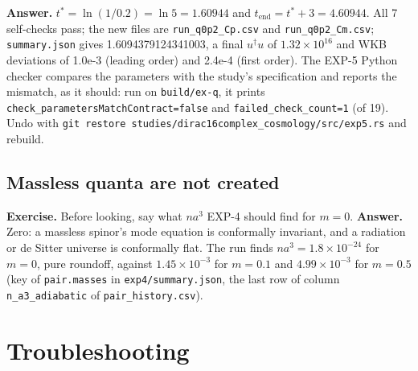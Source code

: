 \documentclass[11pt]{article}
\begin{document}
\textbf{Answer.} $t^*=\ln(1/0.2)=\ln5=1.60944$ and $t_{\mathrm{end}}=t^*+3=4.60944$. All 7 self-checks pass; the new files are \texttt{run\_q0p2\allowbreak{}\_Cp.csv} and \texttt{run\_q0p2\allowbreak{}\_Cm.csv}; \texttt{summary.\allowbreak{}json} gives \texttt{} 1.6094379124341003, a final $u^\dagger u$ of $1.32\times10^{16}$ and WKB deviations of 1.0e-3 (leading order) and 2.4e-4 (first order). The EXP-5 Python checker compares the parameters with the study's specification and reports the mismatch, as it should: run on \texttt{build/ex\allowbreak{}-q}, it prints \texttt{check\_pa\allowbreak{}rameters\allowbreak{}MatchCon\allowbreak{}tract=fa\allowbreak{}lse} and \texttt{failed\_c\allowbreak{}heck\_cou\allowbreak{}nt=1} (of 19). Undo with \texttt{git rest\allowbreak{}ore stud\allowbreak{}ies/dira\allowbreak{}c16compl\allowbreak{}ex\_cosmo\allowbreak{}logy/src\allowbreak{}/exp5.rs} and rebuild.

\subsection{Massless quanta are not created}

\textbf{Exercise.} Before looking, say what $na^3$ EXP-4 should find for $m=0$. \textbf{Answer.} Zero: a massless spinor's mode equation is conformally invariant, and a radiation or de Sitter universe is conformally flat. The run finds $na^3=1.8\times10^{-24}$ for $m=0$, pure roundoff, against $1.45\times10^{-3}$ for $m=0.1$ and $4.99\times10^{-3}$ for $m=0.5$ (key \texttt{} of \texttt{pair.mas\allowbreak{}ses} in \texttt{exp4/sum\allowbreak{}mary.jso\allowbreak{}n}, the last row of column \texttt{n\_a3\_adi\allowbreak{}abatic} of \texttt{pair\_his\allowbreak{}tory.csv}).

\section{Troubleshooting}
\end{document}

